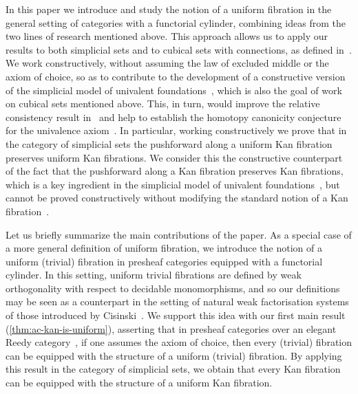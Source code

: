 \documentclass[reqno,10pt,a4paper,oneside,draft]{amsart}
\begin{document}
In this paper we introduce and study the notion of a uniform fibration in the general setting of categories with a functorial cylinder, combining ideas from the two lines of research mentioned above.
This approach allows us to apply our results to both simplicial sets and to cubical sets with connections, as defined in~\cite{coquand-variation}.
We work constructively, \ie without assuming the law of excluded middle or the axiom of choice, so as to contribute to the development of a constructive version of the simplicial model of univalent foundations~\cite{voevodsky-simplicial-model}, which is also the goal of work on cubical sets mentioned above.
This, in turn, would improve the relative consistency result in~\cite[Theorem~3.4.3]{voevodsky-simplicial-model} and help to establish the homotopy canonicity conjecture for the univalence axiom~\cite{voevodsky:uf}.
In particular, working constructively we prove that in the category of simplicial sets the pushforward along a uniform Kan fibration preserves uniform Kan fibrations.
We consider this the constructive counterpart of the fact that the pushforward along a Kan fibration preserves Kan fibrations, which is a key ingredient in the simplicial model of univalent foundations~\cite[Lemma~2.3.1]{voevodsky-simplicial-model}, but cannot be proved constructively without modifying the standard notion of a Kan fibration~\cite{coquand-non-constructivity-kan}.

Let us briefly summarize the main contributions of the paper.
As a special case of a more general definition of uniform fibration, we introduce the notion of a uniform (trivial) fibration in presheaf categories equipped with a functorial cylinder.
In this setting, uniform trivial fibrations are defined by weak orthogonality with respect to decidable monomorphisms, and so our definitions may be seen as a counterpart in the setting of natural weak factorisation systems of those introduced by Cisinski~\cite{cisinski-asterisque}.
We support this idea with our first main result (\cref{thm:ac-kan-is-uniform}), asserting that in presheaf categories over an elegant Reedy category~\cite{bergner-rezk-elegant}, if one assumes the axiom of choice, then every (trivial) fibration can be equipped with the structure of a uniform (trivial) fibration.
By applying this result in the category of simplicial sets, we obtain that every Kan fibration can be equipped with the structure of a uniform Kan fibration.
\end{document}
